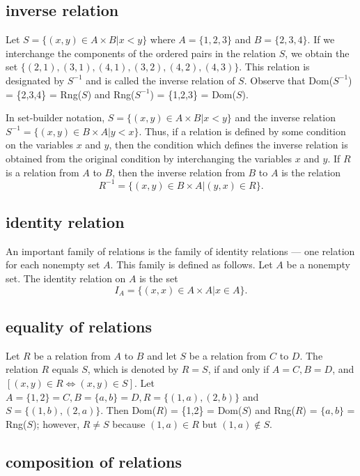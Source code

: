 \documentclass{article}
\begin{document}
    \subsection{inverse relation}

    Let $S = \{(x,y) \in A \times B | x < y\}$ where $A = \{1,2,3\}$ and $B = \{2,3,4\}$. If we interchange the components of the ordered pairs in the relation $S$, we obtain the set $\{(2, 1), (3, 1), (4, 1), (3, 2), (4, 2), (4, 3)\}$. This relation is designated by $S^{-1}$ and is called the inverse relation of $S$. Observe that Dom($S^{-1}$) = \{2,3,4\} = Rng($S$) and Rng($S^{-1}$) = \{1,2,3\} = Dom($S$).

    In set-builder notation, $S = \{(x,y) \in A \times B | x < y\}$ and the inverse relation $S^{-1} = \{(x,y) \in B \times A | y < x\}$. Thus, if a relation is defined by some condition on the variables $x$ and $y$, then the condition which defines the inverse relation is obtained from the original condition by interchanging the variables $x$ and $y$. If $R$ is a relation from $A$ to $B$, then the inverse relation from $B$ to $A$ is the relation
    $$
    R^{-1} = \{(x,y) \in B \times A | (y,x) \in R\}.
    $$

    \subsection{identity relation}

    An important family of relations is the family of identity relations --- one relation for each nonempty set $A$. This family is defined as follows. Let $A$ be a nonempty set. The identity relation on $A$ is the set
    $$
    I_A = \{(x,x) \in A \times A | x \in A\}.
    $$

    \subsection{equality of relations}

    Let $R$ be a relation from $A$ to $B$ and let $S$ be a relation from $C$ to $D$. The relation $R$ equals $S$, which is denoted by $R = S$, if and only if $A = C, B = D$, and $[(x,y) \in R \Leftrightarrow (x,y) \in S]$. Let $A = \{1,2\} = C, B = \{a,b\} = D, R = \{(1,a),(2,b)\}$ and $S = \{(1,b),(2,a)\}$. Then Dom($R$) = \{1,2\} = Dom($S$) and Rng($R$) = $\{a,b\}$ = Rng($S$); however, $R \neq S$ because $(1,a) \in R$ but $(1,a) \notin S$.
    
    \subsection{composition of relations}
\end{document}
